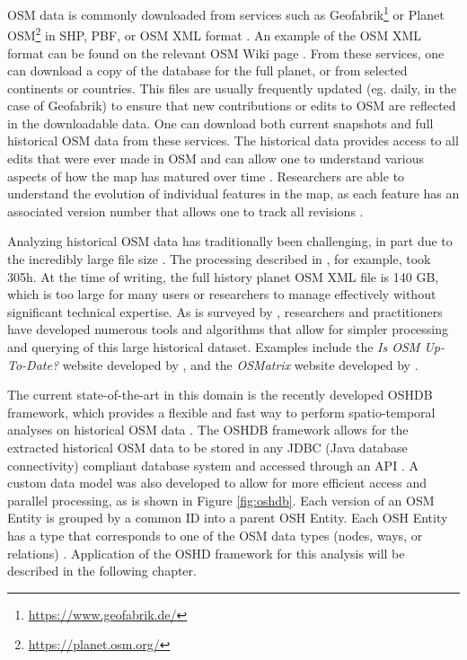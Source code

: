 OSM data is commonly downloaded from services such as Geofabrik\footnote{\url{https://www.geofabrik.de/}} or Planet OSM\footnote{\url{https://planet.osm.org/}} in SHP, PBF, or OSM XML format \parencite{mooney_accessing_2011}. An example of the OSM XML format can be found on the relevant OSM Wiki page \parencite{openstreetmap_wiki_osm_2017}. From these services, one can download a copy of the database for the full planet, or from selected continents or countries. This files are usually frequently updated (eg. daily, in the case of Geofabrik) to ensure that new contributions or edits to OSM are reflected in the downloadable data. One can download both current snapshots and full historical OSM data from these services. The historical data provides access to all edits that were ever made in OSM and can allow one to understand various aspects of how the map has matured over time \parencite{corcoran_analysing_2013, mooney_characteristics_2012}. Researchers are able to understand the evolution of individual features in the map, as each feature has an associated version number that allows one to track all revisions \parencite{openstreetmap_wiki_elements_2020}. 

Analyzing historical OSM data has traditionally been challenging, in part due to the incredibly large file size \parencite{raifer_oshdb_2019, mooney_accessing_2011}. The processing described in \textcite{mooney_characteristics_2012}, for example, took 305h. At the time of writing, the full history planet OSM XML file is 140 GB, which is too large for many users or researchers to manage effectively without significant technical expertise. As is surveyed by \textcite{raifer_oshdb_2019}, researchers and practitioners have developed numerous tools and algorithms that allow for simpler processing and querying of this large historical dataset. Examples include the \textit{Is OSM Up-To-Date?} website developed by \textcite{minghini_open_2018}, and the \textit{OSMatrix} website developed by \textcite{roick_technical_2012}. 

The current state-of-the-art in this domain is the recently developed OSHDB framework, which provides a flexible and fast way to perform spatio-temporal analyses on historical OSM data \parencite{raifer_oshdb_2019}. The OSHDB framework allows for the extracted historical OSM data to be stored in any JDBC (Java database connectivity) compliant database system and accessed through an API \parencite{raifer_oshdb_2019}. A custom data model was also developed to allow for more efficient access and parallel processing, as is shown in Figure \ref{fig:oshdb}. Each version of an OSM Entity is grouped by a common ID into a parent OSH Entity. Each OSH Entity has a type that corresponds to one of the OSM data types (nodes, ways, or relations) \parencite{raifer_oshdb_2019}. Application of the OSHD framework for this analysis will be described in the following chapter.

